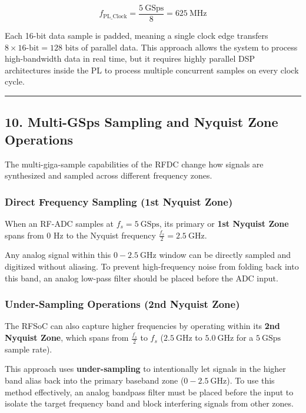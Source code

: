 \documentclass[
]{article}
\begin{document}
\[f_{\text{PL\_Clock}} = \frac{5\ \text{GSps}}{8} = 625\ \text{MHz}\]

Each 16-bit data sample is padded, meaning a single clock edge transfers
\(8 \times 16\text{-bit} = 128\text{ bits}\) of parallel data. This
approach allows the system to process high-bandwidth data in real time,
but it requires highly parallel DSP architectures inside the PL to
process multiple concurrent samples on every clock cycle.

\begin{center}\rule{0.5\linewidth}{0.5pt}\end{center}

\subsection{10. Multi-GSps Sampling and Nyquist Zone
Operations}\label{multi-gsps-sampling-and-nyquist-zone-operations}

The multi-giga-sample capabilities of the RFDC change how signals are
synthesized and sampled across different frequency zones.

\subsubsection{Direct Frequency Sampling (1st Nyquist
Zone)}\label{direct-frequency-sampling-1st-nyquist-zone}

When an RF-ADC samples at \(f_s = 5\ \text{GSps}\), its primary or
\textbf{1st Nyquist Zone} spans from \(0\text{ Hz}\) to the Nyquist
frequency \(\frac{f_s}{2} = 2.5\ \text{GHz}\).

Any analog signal within this \(0 - 2.5\ \text{GHz}\) window can be
directly sampled and digitized without aliasing. To prevent
high-frequency noise from folding back into this band, an analog
low-pass filter should be placed before the ADC input.

\subsubsection{Under-Sampling Operations (2nd Nyquist
Zone)}\label{under-sampling-operations-2nd-nyquist-zone}

The RFSoC can also capture higher frequencies by operating within its
\textbf{2nd Nyquist Zone}, which spans from \(\frac{f_s}{2}\) to \(f_s\)
(\(2.5\ \text{GHz}\) to \(5.0\ \text{GHz}\) for a \(5\ \text{GSps}\)
sample rate).

This approach uses \textbf{under-sampling} to intentionally let signals
in the higher band alias back into the primary baseband zone
(\(0 - 2.5\ \text{GHz}\)). To use this method effectively, an analog
bandpass filter must be placed before the input to isolate the target
frequency band and block interfering signals from other zones.
\end{document}

